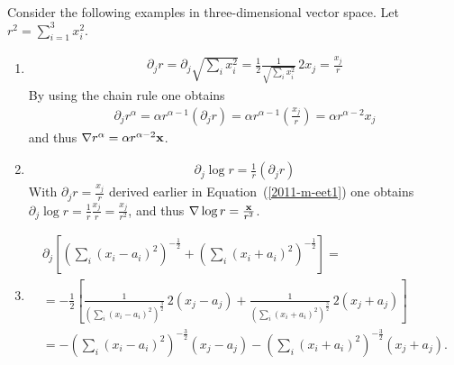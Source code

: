 {
\color{blue}
\bexample

Consider the following examples in three-dimensional vector space.
Let $r^2 = \sum_{i=1 }^3 x_i^2$.

\begin{enumerate}
\item
\begin{equation}
\begin{split}
  \partial_jr =  \partial_j \sqrt{\sum_ix_i^2} =
  \frac{1}{2}\frac{1}{\sqrt{\sum_ix_i^2}}\,2x_j =
  \frac{x_j}{r}
\end{split}
\end{equation}
By using the chain  rule one obtains
\begin{equation}
\begin{split}
  \partial_jr^\alpha =
  \alpha r^{\alpha-1}\left(\partial_jr\right) =
  \alpha r^{\alpha-1}\left(\frac{x_j}{r}\right)=
  \alpha r^{\alpha-2}x_j
\end{split}
\label{2011-m-eet1}
\end{equation}
and thus $\nabla r^\alpha = \alpha r^{\alpha-2}{\bf x}$.


\item
\begin{equation}
\begin{split}
  \partial_j \log r=\frac{1}{r}\left(\partial_jr\right)
\end{split}
\end{equation}
With $
  \partial_jr = \frac{x_j}{r}
$  derived earlier in Equation~(\ref{2011-m-eet1}) one obtains
$
 \partial_j \log r= \frac{1}{r}\frac{x_j}{r}=
  \frac{x_j}{r^2}
$,
and thus $\nabla  \log r =\frac{{\bf x}}{r^2}$.

\item
\begin{equation}
\begin{split}
  \partial_j
  \left[
    \left(
      \sum_i\left(x_i-a_i\right)^2
    \right)^{-\frac{1}{2}}+
    \left(
      \sum_i\left(x_i+a_i\right)^2
    \right)^{-\frac{1}{2}}
  \right]=
\\
  = -\frac{1}{2}\left[\frac{1}{\left(\sum_i\left(x_i-a_i\right)^2\right)^
    \frac{3}{2}}\,2\left(x_j-a_j\right)
  +\frac{1}{\left(\sum_i\left(x_i+a_i\right)^2\right)^\frac{3}{2}}\,
    2\left(x_j+a_j\right)\right]\\
 = -\left(\sum_i\left(x_i-a_i\right)^2\right)^{-\frac{3}{2}}\left(x_j-a_j\right)-
    \left(\sum_i\left(x_i+a_i\right)^2\right)^{-\frac{3}{2}}\left(x_j+a_j\right)   .
\end{split}
\end{equation}


\end{enumerate}}
